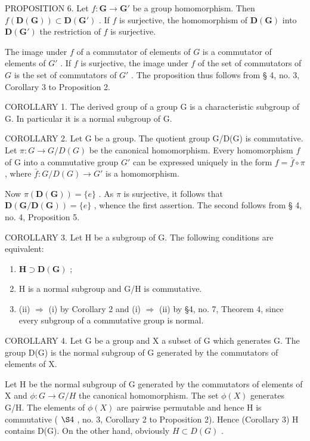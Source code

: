 PROPOSITION 6. Let \(f: \mathbf{G} \to \mathbf{G}'\) be a group homomorphism. Then \(f(\mathbf{D}(\mathbf{G})) \subset \mathbf{D}(\mathbf{G}')\) . If \(f\) is surjective, the homomorphism of \(\mathbf{D}(\mathbf{G})\) into \(\mathbf{D}(\mathbf{G}')\) the restriction of \(f\) is surjective.

The image under \(f\) of a commutator of elements of \(G\) is a commutator of elements of \(G'\) . If \(f\) is surjective, the image under \(f\) of the set of commutators of \(G\) is the set of commutators of \(G'\) . The proposition thus follows from § 4, no. 3, Corollary 3 to Proposition 2.

COROLLARY 1. The derived group of a group G is a characteristic subgroup of G. In particular it is a normal subgroup of G.

COROLLARY 2. Let G be a group. The quotient group G/D(G) is commutative. Let \(\pi: G \to G/D(G)\) be the canonical homomorphism. Every homomorphism \(f\) of G into a commutative group \(G'\) can be expressed uniquely in the form \(f = \bar{f} \circ \pi\) , where \(\bar{f}: G/D(G) \to G'\) is a homomorphism.

Now \(\pi (\mathbf{D}(\mathbf{G})) = \{e\}\) . As \(\pi\) is surjective, it follows that \(\mathbf{D}(\mathbf{G} / \mathbf{D}(\mathbf{G})) = \{e\}\) , whence the first assertion. The second follows from § 4, no. 4, Proposition 5.

COROLLARY 3. Let H be a subgroup of G. The following conditions are equivalent:

\begin{enumerate}
\def\labelenumi{(\roman{enumi})}
\item
  \(\mathbf{H} \supset \mathbf{D}(\mathbf{G})\) ;
\item
  H is a normal subgroup and G/H is commutative.
\item
  (ii) \(\Rightarrow\) (i) by Corollary 2 and (i) \(\Rightarrow\) (ii) by §4, no. 7, Theorem 4, since every subgroup of a commutative group is normal.
\end{enumerate}

COROLLARY 4. Let G be a group and X a subset of G which generates G. The group D(G) is the normal subgroup of G generated by the commutators of elements of X.

Let H be the normal subgroup of G generated by the commutators of elements of X and \(\phi: G \to G/H\) the canonical homomorphism. The set \(\phi(X)\) generates G/H. The elements of \(\phi(X)\) are pairwise permutable and hence H is commutative ( \(\S 4\) , no. 3, Corollary 2 to Proposition 2). Hence (Corollary 3) H contains D(G). On the other hand, obviously \(H \subset D(G)\) .

